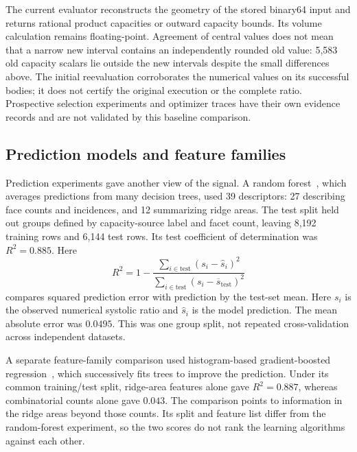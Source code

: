 The current evaluator reconstructs the geometry of the stored binary64 input
and returns rational product capacities or outward capacity bounds. Its
volume calculation remains floating-point. Agreement of central values does
not mean that a narrow new interval contains an independently rounded old
value: 5,583 old capacity scalars lie outside the new intervals despite the
small differences above. The initial reevaluation corroborates the numerical values
on its successful bodies; it does not certify the original execution or the
complete ratio. Prospective selection experiments and optimizer traces have
their own evidence records and are not validated by this baseline comparison.

\subsection{Prediction models and feature families}\label{app:ds-prediction}


Prediction experiments gave another view of the signal. A random forest~\cite{dsBreiman2001},
which averages predictions from many decision trees, used 39 descriptors:
27 describing face counts and incidences, and 12 summarizing ridge areas.
The test split held out groups defined by capacity-source label and facet
count, leaving 8,192 training rows and 6,144 test rows. Its test coefficient
of determination was $R^2=0.885$. Here
\[
 R^2=1-\frac{\sum_{i\in\mathrm{test}}(s_i-\widehat s_i)^2}
                   {\sum_{i\in\mathrm{test}}(s_i-\overline s_{\mathrm{test}})^2}
\]
compares squared prediction error with prediction by the test-set mean.
Here $s_i$ is the observed numerical systolic ratio and $\widehat s_i$
is the model prediction.
The mean absolute error was $0.0495$. This was one group split, not repeated
cross-validation across independent datasets.

A separate feature-family comparison used histogram-based gradient-boosted
regression~\cite{dsSklearnHGB}, which successively fits trees to improve the prediction. Under
its common training/test split, ridge-area features alone gave $R^2=0.887$,
whereas combinatorial counts alone gave $0.043$. The comparison points to
information in the ridge areas beyond those counts. Its split and feature
list differ from the random-forest experiment, so the two scores do not rank
the learning algorithms against each other.

